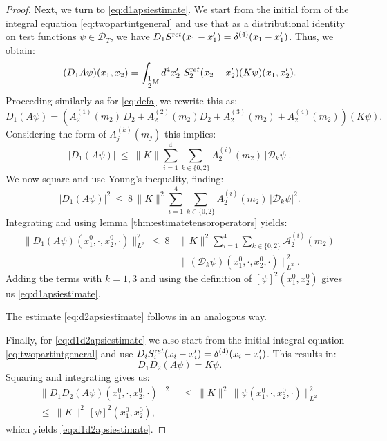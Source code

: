\documentclass[b5paper,draft,openbib,12pt]{memoir}
\newcommand{\M}{\mathbb{M}}
\newcommand{\ret}{{\textup ret}}
\begin{document}
\begin{proof}
Next, we turn to \eqref{eq:d1apsiestimate}. We start from the initial 
form of the integral equation \eqref{eq:twopartintgeneral} and use that as a 
distributional identity on test functions $\psi \in \mathscr{D}_T$, 
we have $D_1 S^\ret(x_1-x_1') = \delta^{(4)}(x_1-x_1')$. Thus, we 
obtain:
\begin{equation}
	(D_1 A \psi)(x_1,x_2) = \int_{\tfrac{1}{2} \M} d^4 x_2' ~S_2^\ret(x_2-x_2') (K \psi)(x_1,x_2').
\end{equation}
Proceeding similarly as for \eqref{eq:defa} we rewrite this as:
\begin{equation}
	D_1 (A \psi)\! =\! \left( A_2^{(1)}(m_2)\, D_2\! +\! A_2^{(2)}(m_2) D_2 \!+\! A_2^{(3)}(m_2) \!+\! A_2^{(4)}(m_2)\right)\! (K\psi).
\end{equation}
Considering the form of $A_j^{(k)}(m_j)$ this implies:
\begin{equation}
	|D_1 (A \psi)| ~\leq~  \| K \| \sum_{i=1}^4 \sum_{k\in \{ 0,2\}} A_2^{(i)}(m_2)\, |\mathcal{D}_k \psi|.
\end{equation}
We now square and use Young's inequality, finding:
\begin{equation}
	|D_1 (A \psi)|^2 ~\leq~  8 \, \| K \|^2 \sum_{i=1}^4 \sum_{k\in \{ 0,2\}} A_2^{(i)}(m_2) \, | \mathcal{D}_k \psi|^2.
\end{equation}
Integrating and using lemma \ref{thm:estimatetensoroperators} yields:
\begin{align}\nonumber
  \| D_1 (A \psi)(x_1^0,\cdot,x_2^0,\cdot)\|^2_{L^2} ~\leq~ 8 \, &\| K \|^2 \sum_{i=1}^4 \sum_{k\in \{ 0,2\}} \mathcal{A}_2^{(i)}(m_2)\,\\
  & \| (\mathcal{D}_k \psi)(x_1^0,\cdot,x_2^0,\cdot) \|^2_{L^2}.
\end{align}
Adding the terms with $k=1,3$ and using the definition of 
$[\psi]^2(x_1^0,x_2^0)$ gives us \eqref{eq:d1apsiestimate}.

The estimate \eqref{eq:d2apsiestimate} follows in an analogous way.

Finally, for \eqref{eq:d1d2apsiestimate} we also start from the 
initial integral equation \eqref{eq:twopartintgeneral} and use 
$D_i S_i^\ret(x_i-x_i') = \delta^{(4)}(x_i-x_i')$. This results in:
\begin{equation}
	D_1 D_2 (A \psi) = K \psi.
\end{equation}
Squaring and integrating gives us:
\begin{align}\nonumber
  \| D_1 D_2 (A \psi)(x_1^0,\cdot,x_2^0,\cdot) \|^2 ~ &\leq ~\| K \|^2 \, \| \psi(x_1^0,\cdot,x_2^0,\cdot) \|^2_{L^2} \\
  \leq~ \| K \|^2 \, [\psi]^2(x_1^0,x_2^0),
\end{align}
which yields \eqref{eq:d1d2apsiestimate}. 
\end{proof}
\end{document}
